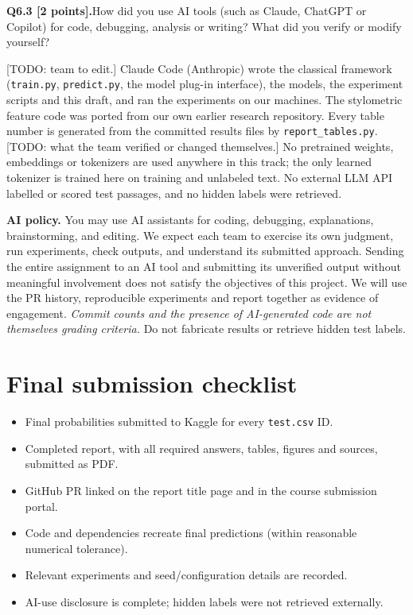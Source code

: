 \documentclass[11pt,letterpaper]{article}
\newcommand{\question}[2]{\needspace{4\baselineskip}\par\addvspace{0.45em}\noindent\textbf{#1}\quad #2\par\nobreak\vspace{0.1em}}
\begin{document}
\question{Q6.3 [2 points].}{How did you use AI tools (such as Claude, ChatGPT or Copilot) for code, debugging, analysis or writing? What did you verify or modify yourself?}
[TODO: team to edit.] Claude Code (Anthropic) wrote the classical framework (\texttt{train.py}, \texttt{predict.py}, the model plug-in interface), the models, the experiment scripts and this draft, and ran the experiments on our machines. The stylometric feature code was ported from our own earlier research repository. Every table number is generated from the committed results files by \texttt{report\_tables.py}. [TODO: what the team verified or changed themselves.] No pretrained weights, embeddings or tokenizers are used anywhere in this track; the only learned tokenizer is trained here on training and unlabeled text. No external LLM API labelled or scored test passages, and no hidden labels were retrieved.

\textbf{AI policy.} You may use AI assistants for coding, debugging, explanations, brainstorming, and editing. We expect each team to exercise its own judgment, run experiments, check outputs, and understand its submitted approach. Sending the entire assignment to an AI tool and submitting its unverified output without meaningful involvement does not satisfy the objectives of this project. We will use the PR history, reproducible experiments and report together as evidence of engagement. \emph{Commit counts and the presence of AI-generated code are not themselves grading criteria.} Do not fabricate results or retrieve hidden test labels.

\section*{Final submission checklist}
\begin{itemize}[label=$\square$]
\item Final probabilities submitted to Kaggle for every \texttt{test.csv} ID.
\item Completed report, with all required answers, tables, figures and sources, submitted as PDF.
\item GitHub PR linked on the report title page and in the course submission portal.
\item Code and dependencies recreate final predictions (within reasonable numerical tolerance).
\item Relevant experiments and seed/configuration details are recorded.
\item AI-use disclosure is complete; hidden labels were not retrieved externally.
\end{itemize}
\end{document}
